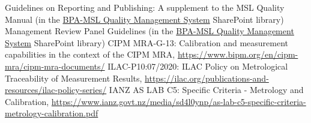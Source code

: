 \begin{thebibliography}{9}
 Guidelines on Reporting and Publishing: A supplement to the MSL Quality Manual (in the \href{https://callaghaninnovationgovtnz.sharepoint.com/sites/bpa-msl-quality-management-system-scie/QualityManual/Forms/AllItems.aspx?viewid=cce925f2%2D7678%2D4e7c%2Da549%2Dd95f5c6af950&id=%2Fsites%2Fbpa%2Dmsl%2Dquality%2Dmanagement%2Dsystem%2Dscie%2FQualityManual%2FMSL%5FGuidelines%5FReporting%5FPublishing%2Epdf&parent=%2Fsites%2Fbpa%2Dmsl%2Dquality%2Dmanagement%2Dsystem%2Dscie%2FQualityManual}{BPA-MSL Quality Management System} SharePoint library)
 Management Review Panel Guidelines (in the \href{https://callaghaninnovationgovtnz.sharepoint.com/sites/bpa-msl-quality-management-system-scie/QualityManual/Forms/AllItems.aspx?viewid=cce925f2%2D7678%2D4e7c%2Da549%2Dd95f5c6af950&id=%2Fsites%2Fbpa%2Dmsl%2Dquality%2Dmanagement%2Dsystem%2Dscie%2FQualityManual%2FMSL%5FGuidelines%5FManagement%5FReview%2Epdf&parent=%2Fsites%2Fbpa%2Dmsl%2Dquality%2Dmanagement%2Dsystem%2Dscie%2FQualityManual}{BPA-MSL Quality Management System} SharePoint library)
 {CIPM MRA-G-13: Calibration and measurement capabilities in the context of the CIPM MRA}, \url{https://www.bipm.org/en/cipm-mra/cipm-mra-documents/}
 {ILAC-P10:07/2020: ILAC Policy on Metrological Traceability of Measurement Results}, \url{https://ilac.org/publications-and-resources/ilac-policy-series/}
 {IANZ AS LAB C5: Specific Criteria - Metrology and Calibration}, \url{https://www.ianz.govt.nz/media/sd4l0ynp/as-lab-c5-specific-criteria-metrology-calibration.pdf}
\end{thebibliography}

\endgroup